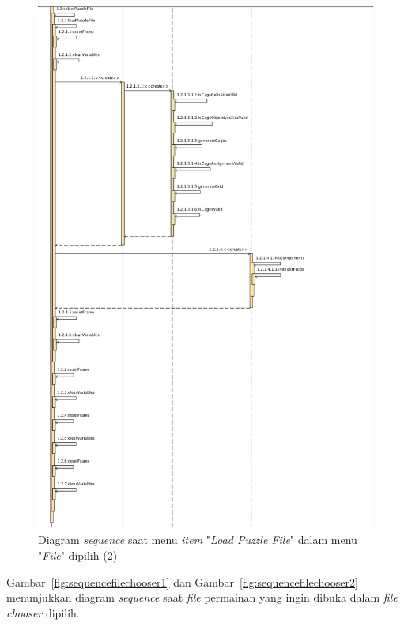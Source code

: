 \begin{figure}
\centering
\captionsetup{justification=centering}
\includegraphics[scale=0.375]{Gambar/Analisis/SequenceDiagramLoad2.png}
\caption[Diagram \textit{sequence} saat menu \textit{item} "\textit{Load Puzzle File}" dalam menu "\textit{File}" dipilih (2)]{Diagram \textit{sequence} saat menu \textit{item} "\textit{Load Puzzle File}" dalam menu "\textit{File}" dipilih (2)}
\label{fig:sequenceload2}
\end{figure}

Gambar~\ref{fig:sequencefilechooser1} dan Gambar~\ref{fig:sequencefilechooser2} menunjukkan diagram \textit{sequence} saat \textit{file} permainan yang ingin dibuka dalam \textit{file chooser} dipilih.

